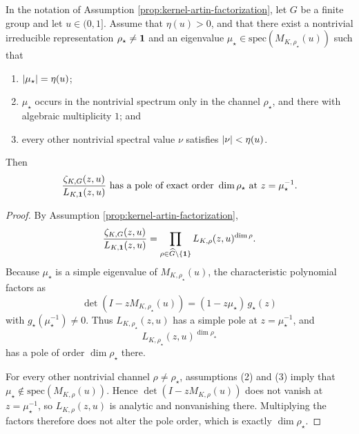 \begin{theorem}\label{thm:kernel-artin-dominant-channel-pole-order}
In the notation of Assumption \ref{prop:kernel-artin-factorization}, let \(G\) be a finite group and let \(u\in(0,1]\). Assume that \(\eta(u)>0\), and that there exist a nontrivial irreducible representation \(\rho_\star\neq\mathbf{1}\) and an eigenvalue \(\mu_\star\in\mathrm{spec}(M_{K,\rho_\star}(u))\) such that
\begin{enumerate}
  \item \(\lvert \mu_\star\rvert=\eta(u)\);
  \item \(\mu_\star\) occurs in the nontrivial spectrum only in the channel \(\rho_\star\), and there with algebraic multiplicity \(1\); and
  \item every other nontrivial spectral value \(\nu\) satisfies \(\lvert \nu\rvert<\eta(u)\).
\end{enumerate}
Then
\[
\frac{\zeta_{K,G}(z,u)}{L_{K,\mathbf{1}}(z,u)}
\text{ has a pole of exact order }\dim\rho_\star\text{ at }z=\mu_\star^{-1}.
\]
\end{theorem}

\begin{proof}
By Assumption \ref{prop:kernel-artin-factorization},
\[
\frac{\zeta_{K,G}(z,u)}{L_{K,\mathbf{1}}(z,u)}
=
\prod_{\rho\in\widehat G\setminus\{\mathbf{1}\}}L_{K,\rho}(z,u)^{\dim\rho}.
\]
Because \(\mu_\star\) is a simple eigenvalue of \(M_{K,\rho_\star}(u)\), the characteristic polynomial factors as
\[
\det(I-zM_{K,\rho_\star}(u))=(1-z\mu_\star)\,g_\star(z)
\]
with \(g_\star(\mu_\star^{-1})\neq 0\). Thus \(L_{K,\rho_\star}(z,u)\) has a simple pole at \(z=\mu_\star^{-1}\), and
\[
L_{K,\rho_\star}(z,u)^{\dim\rho_\star}
\]
has a pole of order \(\dim\rho_\star\) there.

For every other nontrivial channel \(\rho\neq\rho_\star\), assumptions (2) and (3) imply that \(\mu_\star\notin\mathrm{spec}(M_{K,\rho}(u))\). Hence \(\det(I-zM_{K,\rho}(u))\) does not vanish at \(z=\mu_\star^{-1}\), so \(L_{K,\rho}(z,u)\) is analytic and nonvanishing there. Multiplying the factors therefore does not alter the pole order, which is exactly \(\dim\rho_\star\).
\end{proof}

